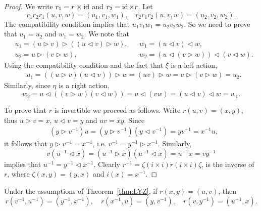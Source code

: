 \begin{proof}
We write $r_1=r\times\operatorname{id}$ and $r_2=\operatorname{id}\times r$. Let
\[
r_1r_2r_1(u,v,w)=(u_1,v_1,w_1),\quad
r_2r_1r_2(u,v,w)=(u_2,v_2,w_2).
\]
The compatibility condition implies that $u_1v_1w_1=u_2v_2w_2$. 
So we need to prove that $u_1=u_2$ and $w_1=w_2$. We note that
\begin{align*}
&u_1=(u\rhd v)\rhd ( (u\lhd v)\rhd w),
&&w_1=(u\lhd v)\lhd w,\\
&u_2=u\rhd (v\rhd w),
&&w_2=(u\lhd (v\rhd w))\lhd (v\lhd w).
\end{align*}
Using the compatibility condition and the fact that $\xi$ is a left action, 
\begin{align*}
    &u_1=((u\rhd v)(u\lhd v))\rhd w=(uv)\rhd w=u\rhd (v\rhd w)=u_2.
\end{align*}
Similarly, since $\eta$ is a right action, 
\[
w_2=u\lhd ((v\rhd w)(v\lhd w))=u\lhd (vw)=(u\lhd v)\lhd w=w_1.
\]

To prove that $r$ is invertible we proceed as follows. 
Write $r(u,v)=(x,y)$, thus $u\rhd v=x$, $u\lhd v=y$ and $uv=xy$. Since 
\begin{align*}
& (y\rhd v^{-1})u=(y\rhd v^{-1})(y\lhd v^{-1})=yv^{-1}=x^{-1}u,
\end{align*}
it follows that $y\rhd v^{-1}=x^{-1}$, i.e. $v^{-1}=y^{-1}\rhd x^{-1}$. Similarly, 
\[
v(u^{-1}\lhd x)=(u^{-1}\rhd x)(u^{-1}\lhd x)=u^{-1}x=vy^{-1}
\]
implies that $u^{-1}=y^{-1}\lhd x^{-1}$. Clearly 
$r^{-1}=\zeta (i\times i) r (i\times i) \zeta$,
is the inverse of $r$, where $\zeta(x,y)=(y,x)$ and $i(x)=x^{-1}$. 
\end{proof}

\begin{proposition}
Under the assumptions of Theorem~\ref{thm:LYZ}, 
if $r(x,y)=(u,v)$, then 
\[
r(v^{-1},u^{-1})=(y^{-1},x^{-1}),
\quad
r(x^{-1},u)=(y,v^{-1}),
\quad
r(v,y^{-1})=(u^{-1},x).
\]
\end{proposition}

